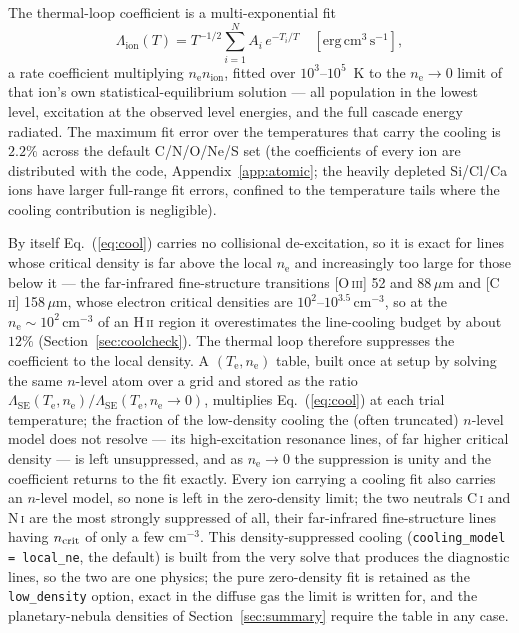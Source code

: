 \documentclass[twocolumn,linenumbers]{aastex702}
\newcommand{\code}[1]{\texttt{#1}}
\newcommand{\HII}{H\,\textsc{ii}}
\newcommand{\Te}{T_{\mathrm{e}}}
\newcommand{\nelec}{n_{\mathrm{e}}}
\begin{document}
The thermal-loop coefficient is a multi-exponential fit
\begin{equation}
  \Lambda_{\mathrm{ion}}(T) = T^{-1/2}\sum_{i=1}^{N} A_i\,e^{-T_i/T}
  \quad [\mathrm{erg\,cm^3\,s^{-1}}],
  \label{eq:cool}
\end{equation}%
a rate coefficient multiplying $\nelec n_{\mathrm{ion}}$, fitted over
$10^3$--$10^5$~K to the $\nelec \to 0$ limit of that ion's own
statistical-equilibrium solution --- all population in the lowest level,
excitation at the observed level energies, and the full cascade energy
radiated.  The maximum fit error over the temperatures that carry the
cooling is $2.2\%$ across the default C/N/O/Ne/S set (the coefficients of
every ion are distributed with the code, Appendix~\ref{app:atomic}; the
heavily depleted Si/Cl/Ca ions have larger full-range fit errors, confined
to the temperature tails where the cooling contribution is negligible).

By itself Eq.~(\ref{eq:cool}) carries no collisional de-excitation, so it is
exact for lines whose critical density is far above the local $\nelec$ and
increasingly too large for those below it --- the far-infrared
fine-structure transitions [O\,\textsc{iii}] 52 and 88\,$\mu$m and
[C\,\textsc{ii}] 158\,$\mu$m, whose electron critical densities are
$10^{2}$--$10^{3.5}\,\mathrm{cm^{-3}}$, so at the
$\nelec \sim 10^2\,\mathrm{cm^{-3}}$ of an \HII{} region it overestimates
the line-cooling budget by about $12\%$ (Section~\ref{sec:coolcheck}).  The
thermal loop therefore suppresses the coefficient to the local density.  A
$(\Te, \nelec)$ table, built once at setup by solving the same $n$-level
atom over a grid and stored as the ratio
$\Lambda_{\mathrm{SE}}(\Te,\nelec)/\Lambda_{\mathrm{SE}}(\Te,\nelec\!\to\!0)$,
multiplies Eq.~(\ref{eq:cool}) at each trial temperature; the fraction of the
low-density cooling the (often truncated) $n$-level model does not resolve
--- its high-excitation resonance lines, of far higher critical density ---
is left unsuppressed, and as $\nelec\to0$ the suppression is unity and the
coefficient returns to the fit exactly.  Every ion carrying a cooling fit
also carries an $n$-level model, so none is left in the zero-density limit;
the two neutrals C\,\textsc{i} and N\,\textsc{i} are the most strongly
suppressed of all, their far-infrared fine-structure lines having
$n_{\rm crit}$ of only a few $\mathrm{cm^{-3}}$.  This density-suppressed cooling
(\code{cooling\_model = local\_ne}, the default) is built from the very
solve that produces the diagnostic lines, so the two are one physics; the
pure zero-density fit is retained as the \code{low\_density} option, exact
in the diffuse gas the limit is written for, and the planetary-nebula
densities of Section~\ref{sec:summary} require the table in any case.
\end{document}
